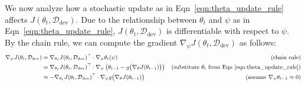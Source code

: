 We now analyze how a stochastic update as in Eqn~\ref{eqn:theta_update_rule} affects $J(\theta_t, \mathcal{D}_{\text{dev}})$. 
Due to the relationship between $\theta_t$ and $\psi$ as in Eqn~\ref{eqn:theta_update_rule}, $J(\theta_t, \mathcal{D}_\text{dev})$ is differentiable with respect to $\psi$. 
By the chain rule, we can compute the gradient $\nabla_\psi J(\theta_t, \mathcal{D}_\text{dev})$ as follows:
\begin{equation}
  \label{eqn:two_step_update}
   \small
  \begin{aligned}
    \nabla_\psi J(\theta_t, \mathcal{D}_\text{dev})
      &= \nabla_{\theta_t} J(\theta_t, \mathcal{D}_\text{dev})^\top \cdot \nabla_\psi \theta_t(\psi) &\text{(chain rule)} \\
      &= \nabla_{\theta_t} J(\theta_t, \mathcal{D}_\text{dev})^\top \cdot \nabla_\psi \left( \theta_{t-1} - g\big( \nabla_\theta J(\theta_{t-1}) \big) \right) &\text{(substitute $\theta_t$ from Eqn~\ref{eqn:theta_update_rule})} \\
      &\approx -\nabla_{\theta_t} J(\theta_t, \mathcal{D}_\text{dev})^\top \cdot \nabla_\psi g\big( \nabla_\theta J(\theta_{t-1}) \big) &\text{(assume $\nabla_\psi \theta_{t-1} \approx 0$)} %
  \end{aligned}
\end{equation}
